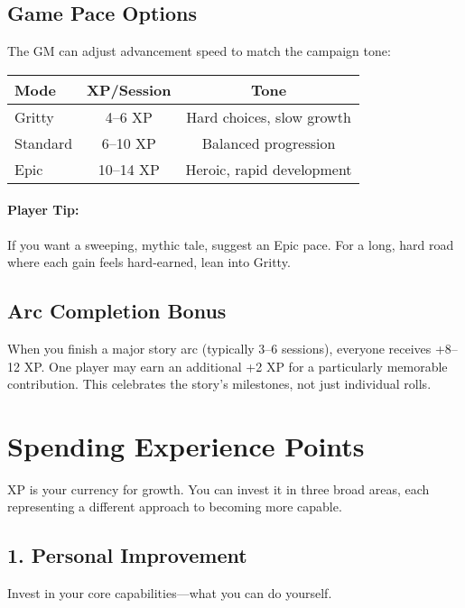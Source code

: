 \subsection*{Game Pace Options}
The GM can adjust advancement speed to match the campaign tone:

\begin{center}
\small
\begin{tabular}{lcc}
\toprule
\textbf{Mode} & \textbf{XP/Session} & \textbf{Tone} \\
\midrule
Gritty & 4–6 XP & Hard choices, slow growth \\
Standard & 6–10 XP & Balanced progression \\
Epic & 10–14 XP & Heroic, rapid development \\
\bottomrule
\end{tabular}
\end{center}

\paragraph{Player Tip:} If you want a sweeping, mythic tale, suggest an Epic pace. For a long, hard road where each gain feels hard-earned, lean into Gritty.

\subsection*{Arc Completion Bonus}
When you finish a major story arc (typically 3–6 sessions), everyone receives +8–12 XP. One player may earn an additional +2 XP for a particularly memorable contribution. This celebrates the story's milestones, not just individual rolls.

\section{Spending Experience Points}

XP is your currency for growth. You can invest it in three broad areas, each representing a different approach to becoming more capable.

\subsection*{1. Personal Improvement}

Invest in your core capabilities—what you can do yourself.

